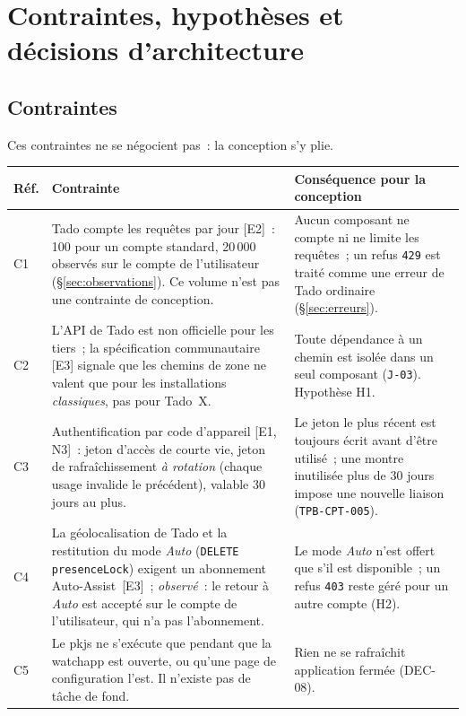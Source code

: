 \section{Contraintes, hypothèses et décisions d'architecture}

\subsection{Contraintes}
\label{sec:contraintes}

Ces contraintes ne se négocient pas~: la conception s'y plie.

{\small
\begin{longtable}{@{}l>{\raggedright\arraybackslash}p{70mm}>{\raggedright\arraybackslash}p{72mm}@{}}
    \toprule
    \textbf{Réf.} & \textbf{Contrainte} & \textbf{Conséquence pour la conception} \\
    \midrule\endhead
    \bottomrule\endfoot
    C1 & Tado compte les requêtes par jour [E2]~: 100 pour un compte standard, 20\,000 observés sur le compte de l'utilisateur (§\ref{sec:observations}). Ce volume n'est pas une contrainte de conception. & Aucun composant ne compte ni ne limite les requêtes~; un refus \texttt{429} est traité comme une erreur de Tado ordinaire (§\ref{sec:erreurs}). \\
    C2 & L'API de Tado est non officielle pour les tiers~; la spécification communautaire [E3] signale que les chemins de zone ne valent que pour les installations \emph{classiques}, pas pour Tado~X. & Toute dépendance à un chemin est isolée dans un seul composant (\texttt{J-03}). Hypothèse H1. \\
    C3 & Authentification par code d'appareil [E1, N3]~: jeton d'accès de courte vie, jeton de rafraîchissement \emph{à rotation} (chaque usage invalide le précédent), valable 30 jours au plus. & Le jeton le plus récent est toujours écrit avant d'être utilisé~; une montre inutilisée plus de 30 jours impose une nouvelle liaison (\texttt{TPB-CPT-005}). \\
    C4 & La géolocalisation de Tado et la restitution du mode \emph{Auto} (\texttt{DELETE presenceLock}) exigent un abonnement Auto-Assist~[E3]~; \emph{observé}~: le retour à \emph{Auto} est accepté sur le compte de l'utilisateur, qui n'a pas l'abonnement. & Le mode \emph{Auto} n'est offert que s'il est disponible~; un refus \texttt{403} reste géré pour un autre compte (H2). \\
    C5 & Le pkjs ne s'exécute que pendant que la watchapp est ouverte, ou qu'une page de configuration l'est. Il n'existe pas de tâche de fond. & Rien ne se rafraîchit application fermée (DEC-08). \\

\end{longtable}}
